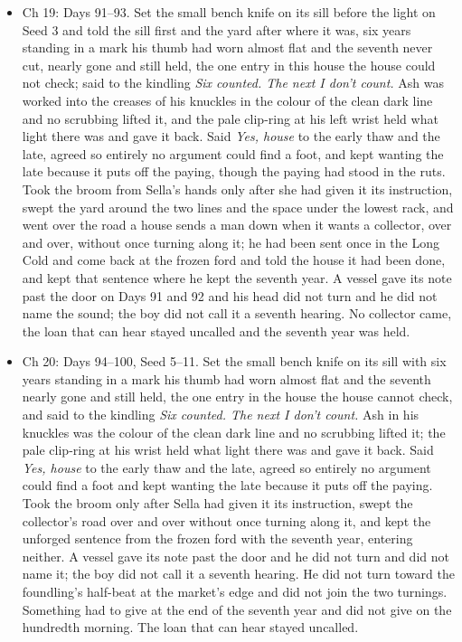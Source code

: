 \documentclass{design/chronicle}
\begin{document}
{\begin{itemize}[leftmargin=1.4em,itemsep=1pt,topsep=3pt,parsep=0pt]
\item Ch 19: Days 91–93. Set the small bench knife on its sill before the light on Seed 3 and told the sill first and the yard after where it was, six years standing in a mark his thumb had worn almost flat and the seventh never cut, nearly gone and still held, the one entry in this house the house could not check; said to the kindling \emph{Six counted. The next I don’t count.} Ash was worked into the creases of his knuckles in the colour of the clean dark line and no scrubbing lifted it, and the pale clip-ring at his left wrist held what light there was and gave it back. Said \emph{Yes, house} to the early thaw and the late, agreed so entirely no argument could find a foot, and kept wanting the late because it puts off the paying, though the paying had stood in the ruts. Took the broom from Sella’s hands only after she had given it its instruction, swept the yard around the two lines and the space under the lowest rack, and went over the road a house sends a man down when it wants a collector, over and over, without once turning along it; he had been sent once in the Long Cold and come back at the frozen ford and told the house it had been done, and kept that sentence where he kept the seventh year. A vessel gave its note past the door on Days 91 and 92 and his head did not turn and he did not name the sound; the boy did not call it a seventh hearing. No collector came, the loan that can hear stayed uncalled and the seventh year was held.

\end{itemize}

\begin{itemize}[leftmargin=1.4em,itemsep=1pt,topsep=3pt,parsep=0pt]

\item Ch 20: Days 94–100, Seed 5–11. Set the small bench knife on its sill with six years standing in a mark his thumb had worn almost flat and the seventh nearly gone and still held, the one entry in the house the house cannot check, and said to the kindling \emph{Six counted. The next I don’t count.} Ash in his knuckles was the colour of the clean dark line and no scrubbing lifted it; the pale clip-ring at his wrist held what light there was and gave it back. Said \emph{Yes, house} to the early thaw and the late, agreed so entirely no argument could find a foot and kept wanting the late because it puts off the paying. Took the broom only after Sella had given it its instruction, swept the collector’s road over and over without once turning along it, and kept the unforged sentence from the frozen ford with the seventh year, entering neither. A vessel gave its note past the door and he did not turn and did not name it; the boy did not call it a seventh hearing. He did not turn toward the foundling’s half-beat at the market’s edge and did not join the two turnings. Something had to give at the end of the seventh year and did not give on the hundredth morning. The loan that can hear stayed uncalled.

\end{itemize}
}
\end{document}
